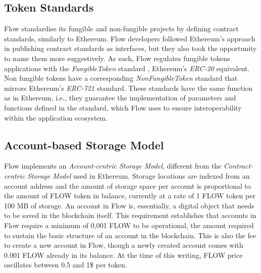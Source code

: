 \documentclass[../NFTComp_IEEE.tex]{subfiles}
\begin{document}
\subsection{Token Standards}
Flow standardise its fungible and non-fungible projects by defining contract standards, similarly to Ethereum. Flow developers followed Ethereum's approach in publishing contract standards as interfaces, but they also took the opportunity to name them more suggestively. As such, Flow regulates fungible tokens applications with the \textit{FungibleToken} standard \cite{Dapper2022c}, Ethereum's \textit{ERC-20} equivalent. Non fungible tokens have a corresponding \textit{NonFungibleToken} standard \cite{Dapper2022d} that mirrors Ethereum's \textit{ERC-721} standard. These standards have the same function as in Ethereum, i.e., they guarantee the implementation of parameters and functions defined in the standard, which Flow uses to ensure interoperability within the application ecosystem.

\subsection{Account-based Storage Model}
Flow implements an \textit{Account-centric Storage Model}, different from the \textit{Contract-centric Storage Model} used in Ethereum. Storage locations are indexed from an account address and the amount of storage space per account is proportional to the amount of FLOW token in balance, currently at a rate of 1 FLOW token per 100 MB of storage. An account in Flow is, essentially, a digital object that needs to be saved in the blockchain itself. This requirement establishes that accounts in Flow require a minimum of 0,001 FLOW to be operational, the amount required to sustain the basic structure of an account in the blockchain. This is also the fee to create a new account in Flow, though a newly created account comes with 0.001 FLOW already in its balance. At the time of this writing, FLOW price oscillates between 0.5 and 1\$ per token.
\end{document}
